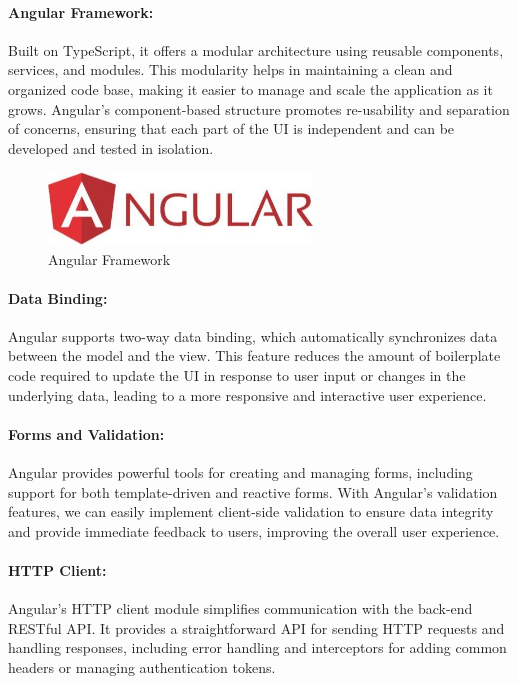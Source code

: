 \documentclass[12pt,a4paper,table,english]{article}
\begin{document}
	
	\paragraph{Angular Framework:}
	Built on TypeScript, it offers a modular architecture using reusable components, services, and modules. This modularity helps in maintaining a clean and organized code base, making it easier to manage and scale the application as it grows. Angular’s component-based structure promotes re-usability and separation of concerns, ensuring that each part of the UI is independent and can be developed and tested in isolation.
	
			
	\begin{figure}[H]
		\centering
		\includegraphics[width=70mm]{Image/angular}
		\caption{Angular Framework}
		\label{fig:Angular Framework}
	\end{figure}
	
	\paragraph{Data Binding:}
	Angular supports two-way data binding, which automatically synchronizes data between the model and the view. This feature reduces the amount of boilerplate code required to update the UI in response to user input or changes in the underlying data, leading to a more responsive and interactive user experience.
	
	\paragraph{Forms and Validation:}
	Angular provides powerful tools for creating and managing forms, including support for both template-driven and reactive forms. With Angular's validation features, we can easily implement client-side validation to ensure data integrity and provide immediate feedback to users, improving the overall user experience.
	
	\paragraph{HTTP Client:}
	Angular’s HTTP client module simplifies communication with the back-end RESTful API. It provides a straightforward API for sending HTTP requests and handling responses, including error handling and interceptors for adding common headers or managing authentication tokens.
	
\end{document}
